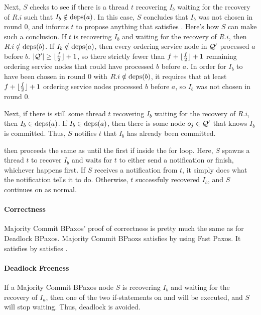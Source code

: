 Next, $S$ checks to see if there is a thread $t$ recovering $I_b$ waiting for
the recovery of $R.i$ such that $I_b \notin \text{deps}(a)$. In this case, $S$
concludes that $I_b$ was not chosen in round $0$, and informs $t$ to propose
anything that satisfies . Here's how $S$ can make
such a conclusion.
%
If $t$ is recovering $I_b$ and waiting for the recovery of $R.i$, then $R.i
\notin \text{deps}(b)$. If $I_b \notin \text{deps}(a)$, then every ordering service node in
$\mathcal{Q}'$ processed $a$ before $b$. $|\mathcal{Q}'| \geq \lfloor\frac{f}{2}\rfloor + 1$, so
there strictly fewer than $f + \lfloor\frac{f}{2}\rfloor + 1$ remaining ordering service
nodes that could have processed $b$ before $a$. In order for $I_b$ to have been
chosen in round $0$ with $R.i \notin \text{deps}(b)$, it requires that at least $f +
\lfloor\frac{f}{2}\rfloor + 1$ ordering service nodes processed $b$ before $a$, so $I_b$
was not chosen in round $0$.

Next, if there is still some thread $t$ recovering $I_b$ waiting for the
recovery of $R.i$, then $I_b \in \text{deps}(a)$. If $I_b \in \text{deps}(a)$, then there
is some node $o_j \in \mathcal{Q}'$ that knows $I_b$ is committed. Thus, $S$
notifies $t$ that $I_b$ has already been committed.

 then proceeds the same as
 until the first if inside the for loop. Here, $S$
spawns a thread $t$ to recover $I_b$ and waits for $t$ to either send a
notification or finish, whichever happens first. If $S$ receives a notification
from $t$, it simply does what the notification tells it to do. Otherwise, $t$
successfuly recovered $I_b$, and $S$ continues on as normal.

\paragraph{Correctness}
Majority Commit BPaxos' proof of correctness is pretty much the same as for
Deadlock BPaxos. Majority Commit BPaoxs satisfies  by
using Fast Paxos. It satisfies  by satisfies
.

\paragraph{Deadlock Freeness}
If a Majority Commit BPaxos node $S$ is recovering $I_b$ and waiting for the
recovery of $I_a$, then one of the two if-statements on
 and  will be executed, and
$S$ will stop waiting. Thus, deadlock is avoided.

